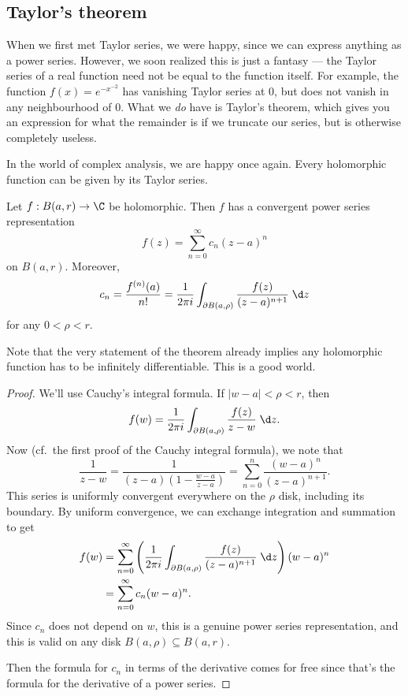 \documentclass[a4paper]{article}
\begin{document}
\subsection{Taylor's theorem}
When we first met Taylor series, we were happy, since we can express anything as a power series. However, we soon realized this is just a fantasy --- the Taylor series of a real function need not be equal to the function itself. For example, the function $f(x) = e^{-x^{-2}}$ has vanishing Taylor series at $0$, but does not vanish in any neighbourhood of $0$. What we \emph{do} have is Taylor's theorem, which gives you an expression for what the remainder is if we truncate our series, but is otherwise completely useless.

In the world of complex analysis, we are happy once again. Every holomorphic function can be given by its Taylor series.
\begin{thm}
  Let $f: B(a, r) \to \C$ be holomorphic. Then $f$ has a convergent power series representation
  \[
    f(z) = \sum_{n = 0}^\infty c_n (z - a)^n
  \]
  on $B(a, r)$. Moreover,
  \[
    c_n = \frac{f^{(n)}(a)}{n!} = \frac{1}{2\pi i}\int_{\partial B(a, \rho)}\frac{f(z)}{(z - a)^{n + 1}}\;\d z
  \]
  for any $0 < \rho < r$.
\end{thm}
Note that the very statement of the theorem already implies any holomorphic function has to be infinitely differentiable. This is a good world.

\begin{proof}
  We'll use Cauchy's integral formula. If $|w - a|< \rho < r$, then
  \[
    f(w) = \frac{1}{2\pi i} \int_{\partial B(a, \rho)} \frac{f(z)}{z - w}\;\d z.
  \]
  Now (cf.\ the first proof of the Cauchy integral formula), we note that
  \[
    \frac{1}{z - w} = \dfrac{1}{(z - a)\left(1 - \frac{w - a}{z - a}\right)} = \sum_{n = 0}^n \frac{(w - a)^n}{(z - a)^{n + 1}}.
  \]
  This series is uniformly convergent everywhere on the $\rho$ disk, including its boundary. By uniform convergence, we can exchange integration and summation to get
  \begin{align*}
    f(w) &= \sum_{n = 0}^\infty \left(\frac{1}{2\pi i} \int_{\partial B(a, \rho)} \frac{f(z)}{(z - a)^{n + 1}}\;\d z\right) (w - a)^n\\
    &= \sum_{n = 0}^\infty c_n (w - a)^n.
  \end{align*}
  Since $c_n$ does not depend on $w$, this is a genuine power series representation, and this is valid on any disk $B(a, \rho) \subseteq B(a, r)$.

  Then the formula for $c_n$ in terms of the derivative comes for free since that's the formula for the derivative of a power series.
\end{proof}
\end{document}
